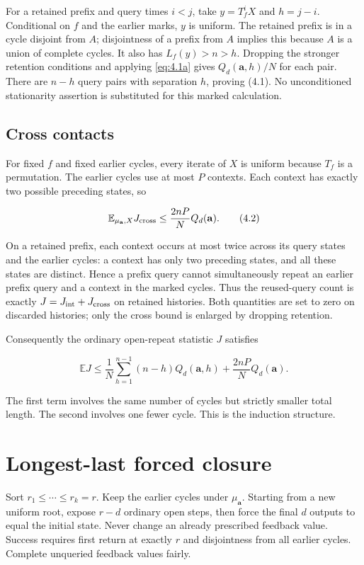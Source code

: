 \documentclass[11pt]{article}
\theoremstyle{remark}
\begin{document}
For a retained prefix and query times \(i<j\), take \(y=T_f^iX\) and
\(h=j-i\). Conditional on \(f\) and the earlier marks, \(y\) is uniform.
The retained prefix is in a cycle disjoint from \(A\); disjointness of a
prefix from \(A\) implies this because \(A\) is a union of complete
cycles. It also has \(L_f(y)>n>h\). Dropping the stronger retention
conditions and applying \eqref{eq:4.1a} gives \(Q_d(\mathbf a,h)/N\) for each
pair. There are \(n-h\) query pairs with separation \(h\), proving
(4.1). No unconditioned stationarity assertion is substituted for this
marked calculation.

\subsection{Cross contacts}\label{cross-contacts}

For fixed \(f\) and fixed earlier cycles, every iterate of \(X\) is
uniform because \(T_f\) is a permutation. The earlier cycles use at most
\(P\) contexts. Each context has exactly two possible preceding states,
so

\[
 \mathbb E_{\mu_{\mathbf a},X}J_{\rm cross}
 \le\frac{2nP}{N}Q_d(\mathbf a).
 \tag{4.2}\label{eq:4.2}
\]

On a retained prefix, each context occurs at most twice across its query
states and the earlier cycles: a context has only two preceding states,
and all these states are distinct. Hence a prefix query cannot
simultaneously repeat an earlier prefix query and a context in the
marked cycles. Thus the reused-query count is exactly
\(J=J_{\rm int}+J_{\rm cross}\) on retained histories. Both quantities
are set to zero on discarded histories; only the cross bound is enlarged
by dropping retention.

Consequently the ordinary open-repeat statistic \(J\) satisfies

\[
 \mathbb E J\le
 \frac1N\sum_{h=1}^{n-1}(n-h)Q_d(\mathbf a,h)
 +\frac{2nP}{N}Q_d(\mathbf a).
 \tag{4.3}\label{eq:4.3}
\]

The first term involves the same number of cycles but strictly smaller
total length. The second involves one fewer cycle. This is the induction
structure.

\section{Longest-last forced closure}\label{longest-last-forced-closure}

Sort \(r_1\le\cdots\le r_k=r\). Keep the earlier cycles under
\(\mu_{\mathbf a}\). Starting from a new uniform root, expose \(r-d\)
ordinary open steps, then force the final \(d\) outputs to equal the
initial state. Never change an already prescribed feedback value.
Success requires first return at exactly \(r\) and disjointness from all
earlier cycles. Complete unqueried feedback values fairly.
\end{document}
